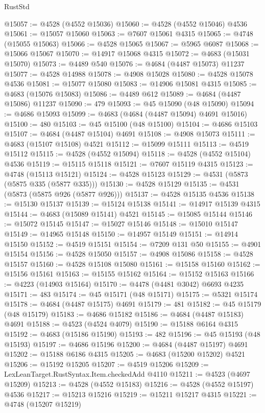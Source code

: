 \begin{lexlean}{RustStd}
\begin{coremodule}
@15057 := @4528 (@4552 @15036)
@15060 := @4528 (@4552 @15046) @4536
@15061 := @15057 @15060
@15063 := @7607 @15061 @4315
@15065 := @4748 (@15055 @15063)
@15066 := @4528 @15065
@15067 := @5965 @6087
@15068 := @15066 @15067
@15070 := @14917 @15068 @4315
@15072 := @4683 (@15031 @15070)
@15073 := @4489 @540
@15076 := @4684 (@4487 @15073) @11237
@15077 := @4528 @14988
@15078 := @4908 @15028
@15080 := @4528 @15078 @4536
@15081 := @15077 @15080
@15083 := @14906 @15081 @4315
@15085 := @4683 (@15076 @15083)
@15086 := @4489 @612
@15089 := @4684 (@4487 @15086) @11237
@15090 := 479
@15093 := @45 @15090 (@48 @15090)
@15094 := @4686 @15093
@15099 := @4683 (@4684 (@4487 @15094) @4691 @15016)
@15100 := 480
@15103 := @45 @15100 (@48 @15100)
@15104 := @4686 @15103
@15107 := @4684 (@4487 @15104) @4691
@15108 := @4908 @15073
@15111 := @4683 (@15107 @15108) @4521
@15112 := @15099 @15111
@15113 := @4519 @15112
@15115 := @4528 (@4552 @15094)
@15118 := @4528 (@4552 @15104) @4536
@15119 := @15115 @15118
@15121 := @7607 @15119 @4315
@15123 := @4748 (@15113 @15121)
@15124 := @4528 @15123
@15129 := @4531 (@5873 (@5875 @335 (@5877 @335)))
@15130 := @4528 @15129
@15135 := @4531 (@5873 (@5875 @926 (@5877 @926)))
@15137 := @4528 @15135 @4536
@15138 := @15130 @15137
@15139 := @15124 @15138
@15141 := @14917 @15139 @4315
@15144 := @4683 (@15089 @15141) @4521
@15145 := @15085 @15144
@15146 := @15072 @15145
@15147 := @15027 @15146
@15148 := @15010 @15147
@15149 := @14965 @15148
@15150 := @14957 @15149
@15151 := @14914 @15150
@15152 := @4519 @15151
@15154 := @7209 @131 @50
@15155 := @4901 @15154
@15156 := @4528 @15050
@15157 := @4908 @15086
@15158 := @4528 @15157
@15160 := @4528 @15108 @15080
@15161 := @15158 @15160
@15162 := @15156 @15161
@15163 := @15155 @15162
@15164 := @15152 @15163
@15166 := @4223 (@14903 @15164)
@15170 := @4478 (@4481 @3042) @6693 @4235
@15171 := 483
@15174 := @45 @15171 (@48 @15171)
@15175 := @5321 @15174
@15178 := @4684 (@4487 @15175) @4691
@15179 := 481
@15182 := @45 @15179 (@48 @15179)
@15183 := @4686 @15182
@15186 := @4684 (@4487 @15183) @4691
@15188 := @4523 (@4524 @4079)
@15190 := @15188 @6164 @4315
@15192 := @4683 (@15186 @15190)
@15193 := 482
@15196 := @45 @15193 (@48 @15193)
@15197 := @4686 @15196
@15200 := @4684 (@4487 @15197) @4691
@15202 := @15188 @6186 @4315
@15205 := @4683 (@15200 @15202) @4521
@15206 := @15192 @15205
@15207 := @4519 @15206
@15209 := LexLeanTarget.RustSyntax.Item.checkedAdd @4110
@15211 := @4523 (@4697 @15209)
@15213 := @4528 (@4552 @15183)
@15216 := @4528 (@4552 @15197) @4536
@15217 := @15213 @15216
@15219 := @15211 @15217 @4315
@15221 := @4748 (@15207 @15219)

\end{coremodule}
\end{lexlean}
